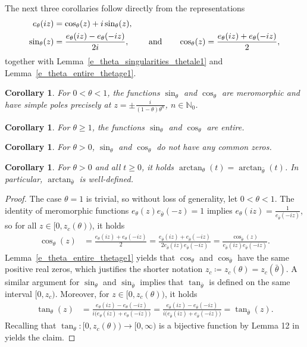 \documentclass[12pt]{article}
\newcommand{\N}{\mathbb{N}} %
\newcommand{\1}{\mathds{1}}
\theoremstyle{definition}
\theoremstyle{plain}
\newtheorem{Corollary}[definition]{Corollary}
\theoremstyle{remark}
\begin{document}
The next three corollaries follow directly from the representations
\begin{align}
     e_\theta(iz)&=\cos_\theta(z)+i\sin_\theta(z),\notag
        \\ \sin_\theta(z)&=\frac{e_\theta(iz)-e_\theta(-iz)}{2i},\qquad\text{ and}\qquad \cos_\theta(z)=\frac{e_\theta(iz)+e_\theta(-iz)}{2},\label{sin_sum_e}
     \end{align}
     together with Lemma~\ref{e_theta_singularities_thetale1} and Lemma~\ref{e_theta_entire_thetage1}.
\begin{Corollary}\label{sin_and_cos_prelim_1}
    For $0<\theta<1$, the functions $\sin_\theta$ and $\cos_\theta$ are meromorphic and have simple poles precisely at $z=\pm\frac{i}{(1-\theta)\theta^n}$, $n\in\N_0$.  
 \end{Corollary}
\begin{Corollary}\label{sin_and_cos_prelim_2}
    For $\theta\ge1$, the functions $\sin_\theta$ and $\cos_\theta$ are entire. 
\end{Corollary}
\begin{Corollary}\label{sin_and_cos_prelim_3}
   For $\theta>0$, $\sin_\theta$ and $\cos_\theta$ do not have any common zeros.
\end{Corollary}
\begin{Corollary}\label{arctan_cor}
   For $\theta >0$ and all $t\ge 0$, it holds $\arctan_{\theta}(t)=\arctan_{\bar\theta }(t)$. In particular, $\arctan_{\bar\theta }$ is well-defined.
\end{Corollary}
\begin{proof}
 The case $\theta=1$ is trivial, so without loss of generality, let $0<\theta<1$. The identity of meromorphic functions $ e_{\theta }(z)e_{\bar\theta }(-z)=1 $ implies $e_{\theta } (iz) = \frac{1}{e_{\bar\theta }(-iz)} $, so for all $z\in[0,z_c(\theta))$, it holds
    \begin{align*}
       \cos_\theta(z)&=\frac{e_\theta(iz)+e_\theta(-iz)}{2}
       =\frac{e_{\bar\theta}(iz)+e_{\bar\theta}(-iz)}{2e_{\bar\theta}(iz)e_{\bar\theta}(-iz)}=\frac{\cos_{\bar\theta}(z)}{e_{\bar\theta}(iz)e_{\bar\theta}(-iz)}.
    \end{align*}
    Lemma~\ref{e_theta_entire_thetage1} yields that $\cos_\theta$ and $\cos_{\bar\theta}$ have the same positive real zeros, which justifies the shorter notation $z_c\coloneqq z_c(\theta)=z_c(\bar\theta)$. A similar argument for $\sin_\theta$ and $\sin_{\bar\theta}$ implies that $\tan_{\bar\theta }$ is defined on the same interval $[0,z_c)$. Moreover, for $z\in[0,z_c(\theta))$, it holds
\begin{align*} 
    \tan_{\theta}(z)
    &= \frac{ e_{\theta } (iz)-e_{\theta }(-iz) }{ i\bigl(e_{\theta } (iz)+e_{\theta }(-iz)\bigr) } 
    = \frac{ e_{\bar\theta } (iz)-e_{\bar\theta }(-iz) }{ i\bigl( e_{\bar\theta } (iz)+e_{\bar\theta }(-iz) \bigr) } 
    = \tan_{\bar\theta }(z).
\end{align*} 
Recalling that $\tan_{\theta}:[0,z_c(\theta))\to[0,\infty)$ is a bijective function by Lemma 12 in \cite{AR} yields the claim.
\end{proof}
\end{document}
